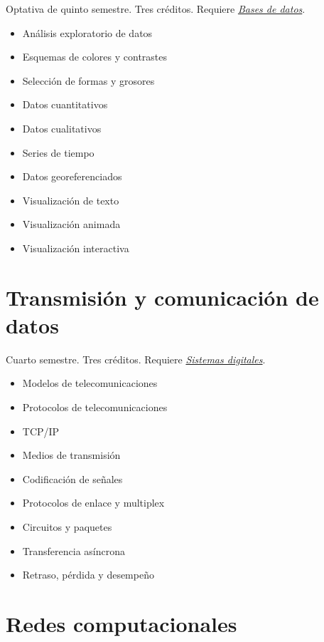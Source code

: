 \documentclass{article}
\begin{document}
\begin{multicols}{4}
Optativa de quinto semestre. Tres cr\'{e}ditos. Requiere
\hyperlink{bdd}{\em Bases de datos}.

\begin{itemize}
\item{An\'{a}lisis exploratorio de datos}
\item{Esquemas de colores y contrastes}
\item{Selecci\'{o}n de formas y grosores}
\item{Datos cuantitativos}
\item{Datos cualitativos}
\item{Series de tiempo}
\item{Datos georeferenciados}
\item{Visualizaci\'{o}n de texto}
\item{Visualizaci\'{o}n animada}  
\item{Visualizaci\'{o}n interactiva}
\end{itemize}

\newpage

\hypertarget{tydcc}{\section*{Transmisi\'{o}n y comunicaci\'{o}n de datos}}   

Cuarto semestre. Tres cr\'{e}ditos. Requiere \hyperlink{sd}{\em
  Sistemas digitales}.

\begin{itemize}
\item{Modelos de telecomunicaciones}  
\item{Protocolos de telecomunicaciones}
\item{TCP/IP}
\item{Medios de transmisi\'{o}n}
\item{Codificaci\'{o}n de se\~{n}ales}
\item{Protocolos de enlace y multiplex}
\item{Circuitos y paquetes}
\item{Transferencia as\'{i}ncrona}
\item{Retraso, p\'{e}rdida y desempe\~{n}o}
\end{itemize}

\vfill\null \columnbreak

\hypertarget{rc}{\section*{Redes computacionales}}  


\end{multicols}
\end{document}
